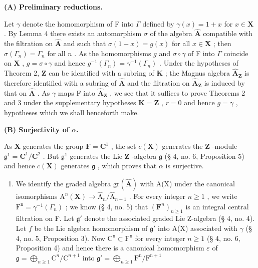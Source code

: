 \textbf{(A) Preliminary reductions.}

Let \(\gamma\) denote the homomorphism of F into \(\Gamma\) defined by \(\gamma(x) = 1 + x\) for \(x \in \mathbf{X}\) . By Lemma 4 there exists an automorphism \(\sigma\) of the algebra \(\hat{\mathbf{A}}\) compatible with the filtration on \(\hat{\mathbf{A}}\) and such that \(\sigma(1 + x) = g(x)\) for all \(x \in \mathbf{X}\) ; then \(\sigma(\Gamma_n) = \Gamma_n\) for all \(n\) . As the homomorphisms \(g\) and \(\sigma \circ \gamma\) of F into \(\Gamma\) coincide on \(\mathbf{X}\) , \(g = \sigma \circ \gamma\) and hence \(g^{-1}(\Gamma_n) = \gamma^{-1}(\Gamma_n)\) . Under the hypotheses of Theorem 2, \(\mathbf{Z}\) can be identified with a subring of \(\mathbf{K}\) ; the Magnus algebra \(\hat{\mathbf{A}}_{\mathbf{Z}}\) is therefore identified with a subring of \(\hat{\mathbf{A}}\) and the filtration on \(\hat{\mathbf{A}}_{\mathbf{Z}}\) is induced by that on \(\hat{\mathbf{A}}\) . As \(\gamma\) maps F into \(\hat{\mathbf{A}}_{\mathbf{Z}}\) , we see that it suffices to prove Theorems 2 and 3 under the supplementary hypotheses \(\mathbf{K} = \mathbf{Z}\) , \(r = 0\) and hence \(g = \gamma\) , hypotheses which we shall henceforth make.

\textbf{(B) Surjectivity of \(\alpha\).}

As \(\mathbf{X}\) generates the group \(\mathbf{F} = \mathbf{C}^1\) , the set \(c(\mathbf{X})\) generates the \(\mathbf{Z}\) -module \(\mathfrak{g}^1 = \mathbf{C}^1 / \mathbf{C}^2\) . But \(\mathfrak{g}^1\) generates the Lie \(\mathbf{Z}\) -algebra \(\mathfrak{g}\) (§ 4, no. 6, Proposition 5) and hence \(c(\mathbf{X})\) generates \(\mathfrak{g}\) , which proves that \(\alpha\) is surjective.

\begin{enumerate}
\def\labelenumi{(\Alph{enumi})}
\setcounter{enumi}{2}
\tightlist
\item
  We identify the graded algebra \(\mathrm{gr}(\hat{\mathbf{A}})\) with A(X) under the canonical isomorphisms \(\mathrm{A}^n (\mathbf{X})\to \hat{\mathrm{A}}_n / \hat{\mathrm{A}}_{n + 1}\) . For every integer \(n\geqslant 1\) , we write \(\mathrm{F^n} = \gamma^{-1}(\Gamma_n)\) ; we know (§ 4, no. 5) that \((\mathbf{F}^n)_{n\geqslant 1}\) is an integral central filtration on F. Let \(\mathfrak{g}'\) denote the associated graded Lie Z-algebra (§ 4, no. 4). Let \(f\) be the Lie algebra homomorphism of \(\mathfrak{g}'\) into A(X) associated with \(\gamma\) (§ 4, no. 5, Proposition 3). Now \(\mathrm{C^n}\subset \mathrm{F^n}\) for every integer \(n\geqslant 1\) (§ 4, no. 6, Proposition 4) and hence there is a canonical homomorphism \(\varepsilon\) of \(\mathfrak{g} = \bigoplus_{n\geqslant 1}\mathrm{C}^n /\mathrm{C}^{n + 1}\) into \(\mathfrak{g}' = \bigoplus_{n\geqslant 1}\mathrm{F^n / F^{n + 1}}\)
\end{enumerate}

